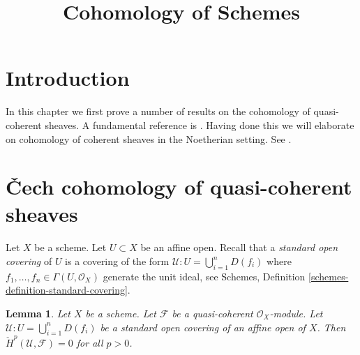 \documentclass{stacks-project}
\theoremstyle{plain}
\newtheorem{lemma}[subsection]{Lemma}
\theoremstyle{definition}
\theoremstyle{remark}
\numberwithin{equation}{subsection}
\begin{document}
\title{Cohomology of Schemes}


\maketitle

\label{section-phantom}

\tableofcontents

\section{Introduction}
\label{section-introduction}

\noindent
In this chapter we first prove a number of results on the cohomology of
quasi-coherent sheaves. A fundamental reference is \cite{EGA}.
Having done this we will elaborate on cohomology of
coherent sheaves in the Noetherian setting. See \cite{FAC}.







\section{{\v C}ech cohomology of quasi-coherent sheaves}
\label{section-cech-quasi-coherent}

\noindent
Let $X$ be a scheme.
Let $U \subset X$ be an affine open.
Recall that a {\it standard open covering} of $U$ is a covering
of the form $\mathcal{U} : U = \bigcup_{i = 1}^n D(f_i)$
where $f_1, \ldots, f_n \in \Gamma(U, \mathcal{O}_X)$ generate
the unit ideal, see
Schemes, Definition \ref{schemes-definition-standard-covering}.

\begin{lemma}
\label{lemma-cech-cohomology-quasi-coherent-trivial}
Let $X$ be a scheme.
Let $\mathcal{F}$ be a quasi-coherent $\mathcal{O}_X$-module.
Let $\mathcal{U} : U = \bigcup_{i = 1}^n D(f_i)$ be a standard
open covering of an affine open of $X$.
Then $\check{H}^p(\mathcal{U}, \mathcal{F}) = 0$ for
all $p > 0$.
\end{lemma}
\end{document}
